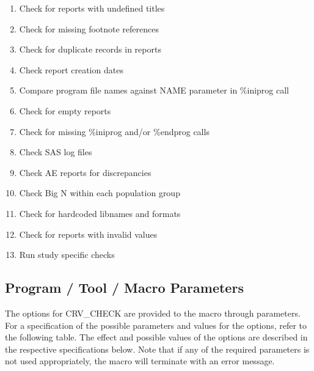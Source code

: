 \documentclass[
  letterpaper,
  DIV=11,
  numbers=noendperiod]{scrartcl}
\begin{document}
\begin{enumerate}
\def\labelenumi{\arabic{enumi}.}
\item
  Check for reports with undefined titles
\item
  Check for missing footnote references
\item
  Check for duplicate records in reports
\item
  Check report creation dates
\item
  Compare program file names against NAME parameter in \%iniprog call
\item
  Check for empty reports
\item
  Check for missing \%iniprog and/or \%endprog calls
\item
  Check SAS log files
\item
  Check AE reports for discrepancies
\item
  Check Big N within each population group
\item
  Check for hardcoded libnames and formats
\item
  Check for reports with invalid values
\item
  Run study specific checks
\end{enumerate}

\hypertarget{program-tool-macro-parameters}{%
\subsection{Program / Tool / Macro
Parameters}\label{program-tool-macro-parameters}}

The options for CRV\_CHECK are provided to the macro through parameters.
For a specification of the possible parameters and values for the
options, refer to the following table. The effect and possible values of
the options are described in the respective specifications below. Note
that if any of the required parameters is not used appropriately, the
macro will terminate with an error message.
\end{document}
